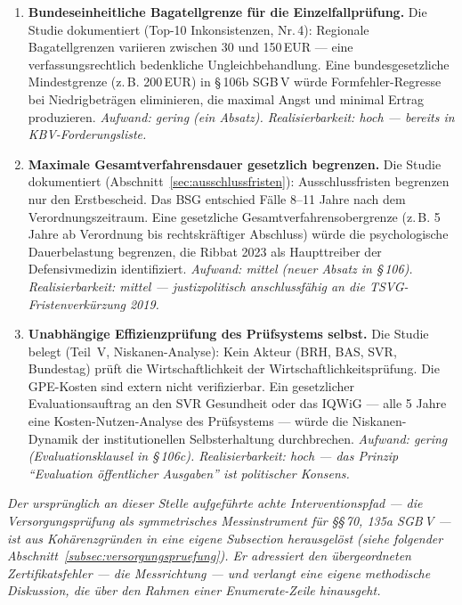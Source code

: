 \documentclass{umbruch-position}
\begin{document}
\begin{enumerate}
  \item \textbf{Bundeseinheitliche Bagatellgrenze für die Einzelfallprüfung.}
  Die Studie dokumentiert (Top-10 Inkonsistenzen, Nr.\,4): Regionale Bagatellgrenzen variieren zwischen 30 und 150\,EUR --- eine verfassungsrechtlich bedenkliche Ungleichbehandlung. Eine bundesgesetzliche Mindestgrenze (z.\,B. 200\,EUR) in \S\,106b SGB\,V würde Formfehler-Regresse bei Niedrigbeträgen eliminieren, die maximal Angst und minimal Ertrag produzieren.
  \textit{Aufwand: gering (ein Absatz). Realisierbarkeit: hoch --- bereits in KBV-Forderungsliste.}

  \item \textbf{Maximale Gesamtverfahrensdauer gesetzlich begrenzen.}
  Die Studie dokumentiert (Abschnitt~\ref{sec:ausschlussfristen}): Ausschlussfristen begrenzen nur den Erstbescheid. Das BSG entschied Fälle 8--11 Jahre nach dem Verordnungszeitraum. Eine gesetzliche Gesamtverfahrensobergrenze (z.\,B. 5 Jahre ab Verordnung bis rechtskräftiger Abschluss) würde die psychologische Dauerbelastung begrenzen, die Ribbat 2023 als Haupttreiber der Defensivmedizin identifiziert.
  \textit{Aufwand: mittel (neuer Absatz in \S\,106). Realisierbarkeit: mittel --- justizpolitisch anschlussfähig an die TSVG-Fristenverkürzung 2019.}

  \item \textbf{Unabhängige Effizienzprüfung des Prüfsystems selbst.}
  Die Studie belegt (Teil~V, Niskanen-Analyse): Kein Akteur (BRH, BAS, SVR, Bundestag) prüft die Wirtschaftlichkeit der Wirtschaftlichkeitsprüfung. Die GPE-Kosten sind extern nicht verifizierbar. Ein gesetzlicher Evaluationsauftrag an den SVR Gesundheit oder das IQWiG --- alle 5 Jahre eine Kosten-Nutzen-Analyse des Prüfsystems --- würde die Niskanen-Dynamik der institutionellen Selbsterhaltung durchbrechen.
  \textit{Aufwand: gering (Evaluationsklausel in \S\,106c). Realisierbarkeit: hoch --- das Prinzip ``Evaluation öffentlicher Ausgaben'' ist politischer Konsens.}

\end{enumerate}

\noindent \textit{Der ursprünglich an dieser Stelle aufgeführte achte Interventionspfad --- die Versorgungsprüfung als symmetrisches Messinstrument für \S\S\,70, 135a SGB\,V --- ist aus Kohärenzgründen in eine eigene Subsection herausgelöst (siehe folgender Abschnitt~\ref{subsec:versorgungspruefung}). Er adressiert den übergeordneten Zertifikatsfehler --- die Messrichtung --- und verlangt eine eigene methodische Diskussion, die über den Rahmen einer Enumerate-Zeile hinausgeht.}
\end{document}
